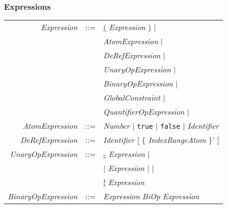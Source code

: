 \documentclass{article}
\begin{document}
\subsubsection{Expressions}
\begin{tabular}{rcl}


\textit{Expression} & ::= & \underline{(} \textit{Expression} \underline{)} $\mid$\\
                    &     & \textit{AtomExpression} $\mid$\\
                    &     & \textit{DeRefExpression} $\mid$\\
                    &     & \textit{UnaryOpExpression} $\mid$\\
                    &     & \textit{BinaryOpExpression} $\mid$\\
                    &     & \textit{GlobalConstraint} $\mid$\\
                    &     & \textit{QuantifierOpExpression} $\mid$\\

\textit{AtomExpression} & ::= & \textit{Number} $\mid$ \texttt{true} $\mid$ \texttt{false} $\mid$ \textit{Identifier} \\
\textit{DeRefExpression} & ::= & \textit{Identifier} \underline{[} \{ \textit{IndexRangeAtom} \}'  \underline{]} \\
\textit{UnaryOpExpression} & ::= & \underline{-} \textit{Expression} $\mid$ \\
                          &     & \underline{$\mid$} \textit{Expression} \underline{$\mid$} $\mid$ \\
                          &     &  \underline{!} \textit{Expression}\\
\textit{BinaryOpExpression} & ::= & \textit{Expression} \textit{BiOp} \textit{Expression}\\


\end{tabular}
\end{document}
